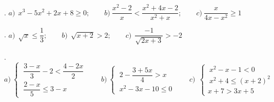 \begin{mipropuesto}
. $a)\ \ x^3-5x^2+2x+8\geqslant 0;\qquad b)\ \dfrac{x^2-2}{x}<\dfrac{x^2+4x-2}{x^2+x}; \qquad c)\ \dfrac{x}{4x-x^2}\geqslant 1$
\end{mipropuesto}
\vspace{-8mm}
\begin{flushright}
	\begin{footnotesize} \textcolor{gris}{\rotatebox{180}{ $a)\ \ [-1,2]\, \cup\, [4,+\infty[;\qquad b)\ ]-\infty,-\sqrt{6}[\, \cup \, ]\sqrt{6},+\infty[;\qquad c)\ [3,4[$ }}	\end{footnotesize}
\end{flushright}

	\begin{mipropuesto}
	. $a)\ \ \sqrt{x}\leqslant \dfrac 1 3 ;\qquad b)\ \ \sqrt{x+2}>2;\qquad c)\ \ \dfrac{-1}{\sqrt{2x+3}}>-2$
	\end{mipropuesto}
	\vspace{-8mm}
	\begin{flushright}
		\begin{footnotesize} \textcolor{gris}{\rotatebox{180}{ $a)\ [0,1/9];\qquad b)\ [2,+\infty[;\qquad c)\ ]-11/8,+\infty[$}}	\end{footnotesize}
	\end{flushright}

\begin{mipropuesto}
. $ a) \ \begin{cases} \ \dfrac{3-x}{3}-2 < \dfrac{4-2x}{2}  \\  \ \dfrac{2-x}{5} \leqslant 3-x \end{cases} \qquad b)\  \begin{cases} \ 2-\dfrac{3+5x}{4}>x \\ \ x^2-3x-10\leqslant 0 \end{cases} \qquad c)\ \ \begin{cases} \ x^2-x-1<0 \\ \ x^2+4\leqslant (x+2)^2 \\ x+7>3x+5 \end{cases}$
\end{mipropuesto}
\vspace{-8mm}
\begin{flushright}
	\begin{footnotesize} \textcolor{gris}{\rotatebox{180}{ $a)\ \ ]-\infty,13/4];\qquad b)\ \ [-2,5/9[; \qquad c)\ \ [0,1[$ }}	\end{footnotesize}
\end{flushright}

